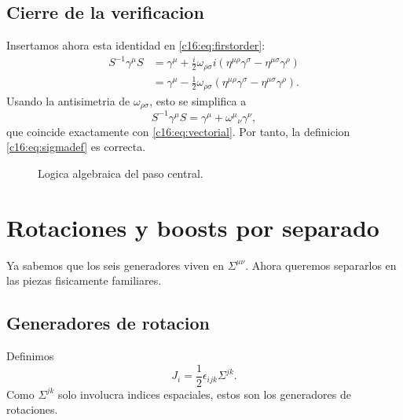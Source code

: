 \subsection{Cierre de la verificacion}
Insertamos ahora esta identidad en \eqref{c16:eq:firstorder}:
\begin{align}
S^{-1}\gamma^\mu S
&=
\gamma^\mu
+\frac{i}{2}\omega_{\rho\sigma}
i(\eta^{\mu\rho}\gamma^\sigma-\eta^{\mu\sigma}\gamma^\rho)
\\
&=
\gamma^\mu
-\frac{1}{2}\omega_{\rho\sigma}
(\eta^{\mu\rho}\gamma^\sigma-\eta^{\mu\sigma}\gamma^\rho).
\end{align}
Usando la antisimetria de $\omega_{\rho\sigma}$, esto se simplifica a
\begin{equation}
S^{-1}\gamma^\mu S
=
\gamma^\mu+\omega^\mu{}_\nu\gamma^\nu,
\end{equation}
que coincide exactamente con \eqref{c16:eq:vectorial}. Por tanto, la definicion \eqref{c16:eq:sigmadef} es correcta.

\begin{figure}[h!]
\centering
{}
\caption{Logica algebraica del paso central.}
\end{figure}

\section{Rotaciones y boosts por separado}
Ya sabemos que los seis generadores viven en $\Sigma^{\mu\nu}$. Ahora queremos separarlos en las piezas fisicamente familiares.

\subsection{Generadores de rotacion}
Definimos
\begin{equation}
J_i = \frac{1}{2}\epsilon_{ijk}\Sigma^{jk}.
\label{c16:eq:Jdef}
\end{equation}
Como $\Sigma^{jk}$ solo involucra indices espaciales, estos son los generadores de rotaciones.


